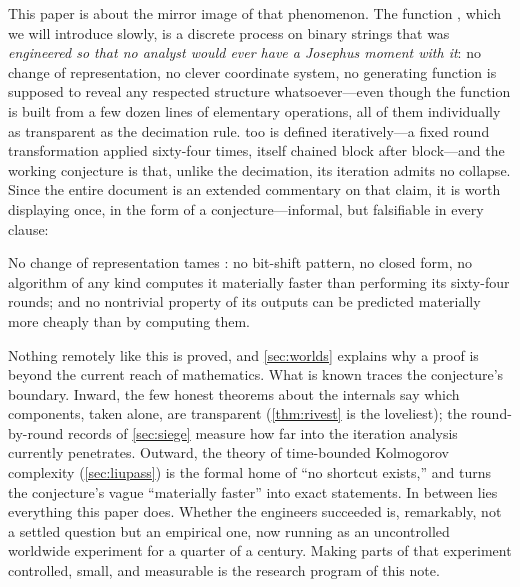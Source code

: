 This paper is about the mirror image of that phenomenon. The function
\SHA{}, which we will introduce slowly, is a discrete process on binary
strings that was \emph{engineered so that no analyst would ever have a
Josephus moment with it}: no change of representation, no clever
coordinate system, no generating function is supposed to reveal any
respected structure whatsoever---even though the function is built from a
few dozen lines of elementary operations, all of them individually as
transparent as the decimation rule. \SHA{} too is defined iteratively---a
fixed round transformation applied sixty-four times, itself chained block
after block---and the working conjecture is that, unlike the decimation,
its iteration admits no collapse. Since the entire document is an
extended commentary on that claim, it is worth displaying once, in the
form of a conjecture---informal, but falsifiable in every clause:

\begin{conjecture}
\label{conj:nocollapse}
No change of representation tames \SHA{}: no bit-shift pattern, no
closed form, no algorithm of any kind computes it materially faster
than performing its sixty-four rounds; and no nontrivial property of
its outputs can be predicted materially more cheaply than by computing
them.
\end{conjecture}

\noindent
Nothing remotely like this is proved, and \cref{sec:worlds} explains
why a proof is beyond the current reach of mathematics. What is known
traces the conjecture's boundary. Inward, the few honest theorems about
the internals say which components, taken alone, are transparent
(\cref{thm:rivest} is the loveliest); the round-by-round records of
\cref{sec:siege} measure how far into the iteration analysis currently
penetrates. Outward, the theory of time-bounded Kolmogorov complexity
(\cref{sec:liupass}) is the formal home of ``no shortcut exists,'' and
turns the conjecture's vague ``materially faster'' into exact
statements. In between lies everything this paper does. Whether the
engineers succeeded is, remarkably, not a settled question but an
empirical one, now running as an uncontrolled worldwide experiment for
a quarter of a century. Making parts of that experiment controlled,
small, and measurable is the research program of this note.
